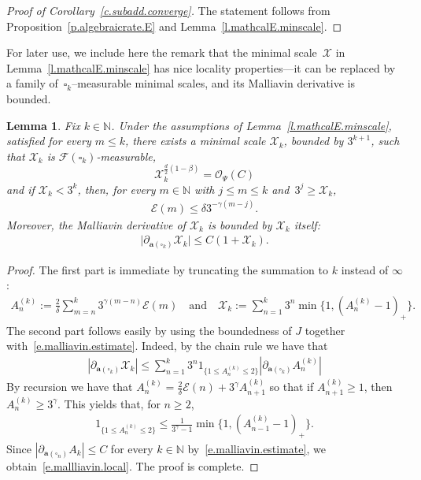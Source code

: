 \documentclass[11pt]{article} %
\let\oldsquare\square %
\renewcommand{\square}{\oldsquare}
\numberwithin{equation}{section}
\newtheorem{lemma}[theorem]{Lemma}
\theoremstyle{definition}
\newcommand*{\N}{\ensuremath{\mathbb{N}}}
\newcommand{\qand}{\quad \mbox{and} \quad }
\renewcommand{\a}{\mathbf{a}}
\newcommand{\cu}{\square}
\newcommand{\F}{\mathcal{F}}
\newcommand{\X}{\mathcal{X}}
\renewcommand{\O}{\mathcal{O}}
\newcommand{\indc}{1}
\begin{document}
\begin{proof}[{Proof of Corollary~\ref{c.subadd.converge}}]
The statement follows from Proposition~\ref{p.algebraicrate.E} and Lemma~\ref{l.mathcalE.minscale}.
\end{proof}


For later use, we include here the remark that the minimal scale~$\X$ in Lemma~\ref{l.mathcalE.minscale} has nice locality properties---it can be replaced by a family of~$\cu_k$--measurable minimal scales, and its Malliavin derivative is bounded. 

\begin{lemma} 
\label{l.localX}
Fix $k \in \N$. Under the assumptions of Lemma~\ref{l.mathcalE.minscale}, satisfied for every $m \leq k$, there exists a minimal scale $\X_k$, bounded by $3^{k+1}$, such that $\X_k$ is $\F(\cu_k)$-measurable, 
\begin{equation}
\label{e.minscaleint.local}
\X_k^{\frac d2 (1-\beta)}
= 
\O_{\Psi}(C) 
\end{equation}
and if $\X_k < 3^k$, then, for every $m \in \N$ with $j \leq m \leq k$ and~$3^j \geq \X_k$,
\begin{align}
\label{e.convssmaxsmax.local}
\mathcal{E}(m) 
\leq
\delta 3^{-\gamma(m-j)}.
\end{align}
Moreover, the Malliavin derivative of $\X_k$ is bounded by $\X_k$ itself:
\begin{align} \label{e.mallliavin.local}
\bigl| \partial_{\a(\cu_k)} \X_k  \bigr| \leq C (1+\X_k) .
\end{align}
\end{lemma}
\begin{proof}
The first part is immediate by truncating the summation to $k$ instead of $\infty$:
\begin{align*}  
A_n^{(k)} := \frac 2{\delta }  \sum_{m=n}^k 3^{\gamma (m-n)} \mathcal{E}(m) 
\qand 
\X_k
:=  
\sum_{n=1}^{k} 3^n \min\big \{ 1 ,  (A_n^{(k)} - 1)_+ \big\}  
.
\end{align*}
The second part follows easily by using the boundedness of $J$ together with~\eqref{e.malliavin.estimate}. Indeed, by the chain rule we have that 
\begin{align*}  
| \partial_{\a(\cu_k)} \X_k | 
\leq 
\sum_{n=1}^k 3^n \indc_{\{1\leq A_ n^{(k)} \leq 2\}} |\partial_{\a(\cu_k)} A_n^{(k)}|
\end{align*}
By recursion we have that $A_n^{(k)} = \frac 2{\delta}  \mathcal{E}(n) + 3^{\gamma} A_{n+1}^{(k)} $ so that if $A_{n+1}^{(k)} \geq 1$, then $A_n^{(k)} \geq 3^{\gamma}$. This yields that, for $n \geq 2$,  
\begin{align*}  
\indc_{\{1\leq A_ n^{(k)} \leq 2\}}  \leq \frac1{3^{\gamma}-1} 
\min\big \{ 1 ,  (A_{n-1}^{(k)} - 1)_+ \big\}  .
\end{align*}
Since $| \partial_{\a(\cu_n)} A_k| \leq C$ for every $k \in \N$ by~\eqref{e.malliavin.estimate}, we obtain~\eqref{e.mallliavin.local}. The proof is complete. 
\end{proof}
\end{document}
